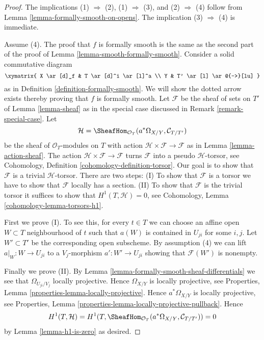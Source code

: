 \begin{proof}
The implications (1) $\Rightarrow$ (2),
(1) $\Rightarrow$ (3), and (2) $\Rightarrow$ (4) follow from
Lemma \ref{lemma-formally-smooth-on-opens}.
The implication (3) $\Rightarrow$ (4) is immediate.

\medskip\noindent
Assume (4). The proof that $f$ is formally smooth is the same
as the second part of the proof of Lemma \ref{lemma-smooth-formally-smooth}.
Consider a solid commutative diagram
$$
\xymatrix{
X \ar[d]_f & T \ar[d]^i \ar[l]^a \\
Y & T' \ar[l] \ar@{-->}[lu]
}
$$
as in Definition \ref{definition-formally-smooth}.
We will show the dotted arrow exists thereby
proving that $f$ is formally smooth.
Let $\mathcal{F}$ be the sheaf of sets on $T'$ of
Lemma \ref{lemma-sheaf} as in the special case discussed in
Remark \ref{remark-special-case}.
Let
$$
\mathcal{H} =
\SheafHom_{\mathcal{O}_T}(a^*\Omega_{X/Y}, \mathcal{C}_{T/T'})
$$
be the sheaf of $\mathcal{O}_T$-modules on $T$
with action $\mathcal{H} \times \mathcal{F} \to \mathcal{F}$ as in
Lemma \ref{lemma-action-sheaf}.
The action $\mathcal{H} \times \mathcal{F} \to \mathcal{F}$
turns $\mathcal{F}$ into a pseudo $\mathcal{H}$-torsor, see
Cohomology, Definition \ref{cohomology-definition-torsor}.
Our goal is to show that $\mathcal{F}$ is a trivial $\mathcal{H}$-torsor.
There are two steps: (I) To show that $\mathcal{F}$ is a torsor
we have to show that $\mathcal{F}$ locally has a
section. (II) To show that $\mathcal{F}$ is the trivial torsor
it suffices to show that $H^1(T, \mathcal{H}) = 0$, see
Cohomology, Lemma \ref{cohomology-lemma-torsors-h1}.

\medskip\noindent
First we prove (I). To see this, for every $t \in T$ we can
choose an affine open $W \subset T$ neighbourhood of $t$
such that $a(W)$ is contained in $U_{ji}$ for some $i, j$.
Let $W' \subset T'$ be the corresponding open subscheme.
By assumption (4) we can lift $a|_W : W \to U_{ji}$
to a $V_j$-morphism $a' : W' \to U_{ji}$ showing that
$\mathcal{F}(W')$ is nonempty.

\medskip\noindent
Finally we prove (II). By
Lemma \ref{lemma-formally-smooth-sheaf-differentials}
we see that $\Omega_{U_{ji}/V_j}$ locally projective.
Hence $\Omega_{X/Y}$ is locally projective, see
Properties, Lemma \ref{properties-lemma-locally-projective}.
Hence $a^*\Omega_{X/Y}$ is locally projective, see
Properties, Lemma \ref{properties-lemma-locally-projective-pullback}.
Hence
$$
H^1(T, \mathcal{H}) =
H^1(T, \SheafHom_{\mathcal{O}_T}(a^*\Omega_{X/Y}, \mathcal{C}_{T/T'})) = 0
$$
by
Lemma \ref{lemma-h1-is-zero}
as desired.
\end{proof}

